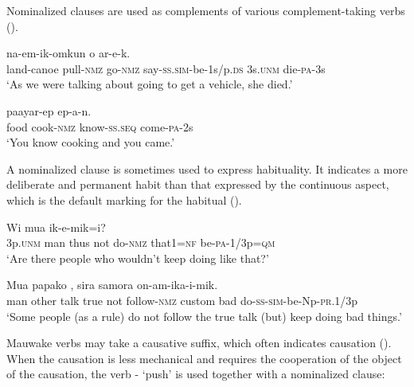 Nominalized clauses are used as complements of various complement-taking verbs (). 

\ea%
\label{ex:x1246}
\gll {}   na-em-ik-omkun o  ar-e-k. \\
     land-canoe  pull-\textsc{nmz}  go-\textsc{nmz}  say-\textsc{ss}.\textsc{sim}-be-1s/p.\textsc{ds} 3s.\textsc{unm}  die-\textsc{pa}-3s \\
\glt `As we were talking about going to get a vehicle, she died.'
\z

\ea%
\label{ex:x1248}
\gll {}   paayar-ep  ep-a-n. \\
     food  cook-\textsc{nmz}  know-\textsc{ss}.\textsc{seq}  come-\textsc{pa}-2s \\
\glt `You know cooking and you came.'
\z

A nominalized clause is sometimes used to express habituality. It indicates a more deliberate and permanent habit than that expressed by the continuous aspect, which is the default marking for the habitual (). 

\ea%
\label{ex:x1249}
\gll Wi  mua       ik-e-mik=i? \\
     3p.\textsc{unm}  man  thus  not  do-\textsc{nmz}  that1=\textsc{nf}  be-\textsc{pa}-1/3p=\textsc{qm} \\
\glt `Are there people who wouldn't keep doing like that?'
\z

\ea%
\label{ex:x1250}
\gll Mua  papako     ,  sira  samora on-am-ika-i-mik. \\
     man  other  talk  true  not  follow-\textsc{nmz}  custom  bad do-\textsc{ss}-\textsc{sim}-be-Np-\textsc{pr}.1/3p \\
\glt `Some people (as a rule) do not follow the true talk (but) keep doing bad things.'
\z

Mauwake verbs may take a causative suffix, which often indicates causation (). When the causation is less mechanical and requires the cooperation of the object of the causation, the verb - `push' is used together with a nominalized clause:

